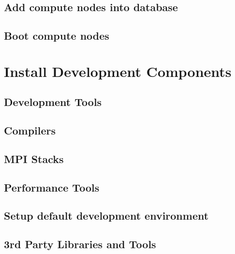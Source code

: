 \documentclass[letterpaper]{article}
\begin{document}
\subsection{Add compute nodes into \xCAT{} database} \label{sec:xcat_add_nodes}


\vspace*{0.1cm}
\subsection{Boot compute nodes} \label{sec:boot_computes}


\section{Install \OHPC{} Development Components}


\vspace*{-0.15cm}
\subsection{Development Tools} \label{sec:install_dev_tools}


\vspace*{-0.15cm}
\subsection{Compilers} \label{sec:install_compilers}


\subsection{MPI Stacks} \label{sec:mpi}


\subsection{Performance Tools} \label{sec:install_perf_tools}


\subsection{Setup default development environment}


\vspace*{0.3cm}
\subsection{3rd Party Libraries and Tools} \label{sec:3rdparty}



\vspace*{0.1cm}

\vspace*{0.5cm}
\end{document}
